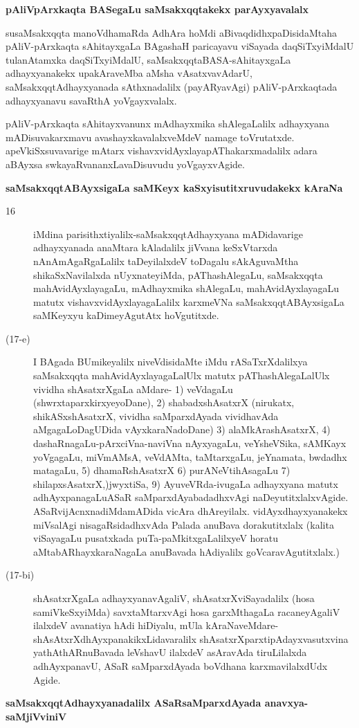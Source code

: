\eject

{\medskip
\noindent
{\large\bf pAliVpArxkaqta BASegaLu saMsakxqqtakekx parAyxyavalalx}}\label{page44}
\medskip

\noindent
susaMsakxqqta manoVdhamaRda AdhAra hoMdi aBivaqdidhxpaDisidaMtaha pAliV-pArxkaqta sAhitayxgaLa BAga\-shaH paricayavu viSayada daqSiTx\-yiMdalU tulanAtamxka daqSiTx\break\-yiMdalU, saMsakxqqtaBASA-sAhitayxgaLa adhayx\-yanakekx upakAraveMba aMsha vAsatxva\-vAdarU, saMsakxqqtAdhayxyanada sAthxnadalilx (payARyavAgi) pAliV-\-pArxkaqtada adhayx\-yanavu savaRthA yoVgayxvalalx.


pAliV-pArxkaqta sAhitayxvanunx mAdhayxmika shAlegaLalilx adhayxyana mADisuva\break \hbox{karxmavu} avashayxka\-valalx\-veMdeV namage toVrutatxde. apeVkiSxsuvavarige mAtarx vishavx\-vidAyx\-layapAThakarxmadalilx adara aBAyxsa swkayaRvananxLa\-vaDisu\-vudu yoVgayxvAgide.

{\bigskip
\noindent
{\large\bf saMsakxqqtABAyxsigaLa saMKeyx kaSxyisutitxruvudakekx kAraNa}}\label{page45}

\begin{description}
\item[16] iMdina parisithxtiyalilx-saMsakxqqtAdhayxyana mADidavarige adhayxyanada anaM\-tara kAladalilx jiVvana keSxVtarxda nAnAmAgaRgaLalilx taDeyilalxdeV toDagalu sAkA\-guvaMtha shikaSxNavilalxda nUyxnateyiMda, pAThashAlegaLu, saMsakxqqta mahA\-vidAyx\-layagaLu, mAdhayxmika shAlegaLu, mahAvidAyxlayagaLu matutx vishavxvidAyx\-layagaLalilx karxmeVNa saMsakxqqtABAyxsigaLa saMKeyxyu kaDimeyAgutAtx hoVgutitxde.

\item[(17-e)] I BAgada BUmikeyalilx niveVdisidaMte iMdu rASaTxrXdalilxya saMsakxqqta mahAvidAyxlayagaLalUlx matutx pAThashAlegaLalUlx vividha shAsatxrXgaLa \hbox{aMdare-}
1) veVdagaLu (shwrxtaparxkirxyeyoDane), 2) shabadxshAsatxrX (nirukatx, shikASxshAsatxrX, vividha saMparxdAyada vividhavAda aMgagaLoDagUDida vAyxkaraNa\-doDane) 3) alaMkArashAsatxrX, 4) dashaRnagaLu-pArxciVna-naviVna nAyxyagaLu, veYsheV\-Sika, sAMKayx yoVgagaLu, miVmAMsA, veVdAMta, taMtarxgaLu, jeYnamata, bwdadhx matagaLu, 
5) dhamaRshAsatxrX 6) purANeVtihAsagaLu 7) shilapxsAsatxrX,)jwyxtiSa, 9) AyuveVRda-ivugaLa adhayxyana matutx adhAyxpanagaLu\break ASaR saMparxdAyabadadhxvAgi naDeyutitxlalxvAgide. ASaR\-vijAcnxnadiMda\break \hbox{mADida} vicAra dhAreyilalx. vidAyxdhayxyanakekx miVsalAgi nisagaRsidadhx\-vAda Palada anuBava doraku\-titxlalx (kalita viSayagaLu pusatxkada puTa-paMkitxgaLalilxyeV horatu aMtabARhayxkaraNagaLa anuBavada hAdi\-yalilx goVcaravAgutitxlalx.)

\item[(17-bi)] shAsatxrXgaLa adhayxyanavAgaliV, shAsatxrXviSayadalilx (hosa samiVkeSxyiMda) savxtaMtarxvAgi hosa garxMthagaLa racaneyAgaliV ilalxdeV avanatiya hAdi hiDiyalu, mUla kAraNaveMdare-\-shAsAtxrXdhAyxpanakikxLidavaralilx shAsatxrXparxti\-pAdayx\-vasutxvina yathAthARnuBavada leVshavU ilalxdeV asAra\-vAda tiruLilalxda adhAyxpanavU, ASaR saMparxdAyada boVdhana karxmavilalxdUdx Agide.
\end{description}
{\medskip
\noindent
{\large\bf saMsakxqqtAdhayxyanadalilx ASaRsaMparxdAyada anavxya-saMjiVviniV}}\label{page45}

